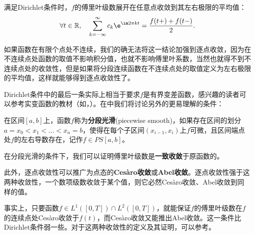 \begin{theorem}[Dirichlet定理]
    满足Dirichlet条件时，$f$的傅里叶级数展开在任意点收敛到其左右极限的平均值：
    \begin{equation}
        \forall t\in \mathbb{R},\quad \sum_{k=-\infty}^{\infty}c_k \e^{\im 2\pi kt}=\frac{f(t+)+f(t-)}{2}.
    \end{equation}
\end{theorem}

如果函数在有限个点处不连续，我们的确无法将这一结论加强到逐点收敛，因为在不连续点处函数的取值不影响积分值，也就不影响傅里叶系数，当然也就得不到不连续点处的收敛性，但是如果将分段连续函数在不连续点处的取值定义为左右极限的平均值，这样就能够得到逐点收敛性了。

Dirichlet条件中的最后一条实际上相当于要求$f$是有界变差函数，感兴趣的读者可以参考实变函数的教材（如\cite{simple_real_analysis}，\cite{real_analysis}）。在中我们将讨论另外的更易理解的条件：
\begin{definition}[分段光滑]
    \label{def:piecewice_smooth}
    在区间$[a,b]$上，函数$f$称为\textbf{分段光滑}(piecewise smooth)，如果存在区间的划分$a=x_0<x_1<\dots <x_n=b$，使得在每个子区间$(x_{i-1},x_i)$上$f$可微，且区间端点处$f$的左右导数存在，记作$f\in PS[a,b]$。
\end{definition}
在分段光滑的条件下，我们可以证明傅里叶级数是\textbf{一致收敛}于原函数的。

此外，逐点收敛性可以推广为点态的\textbf{Cesàro收敛}或\textbf{Abel收敛}。逐点收敛性强于这两种收敛性，一个数项级数收敛于某个值，则它必然Cesàro收敛、Abel收敛到同样的值。

事实上，只要函数$f\in L^1([0,T])\cap L^2([0,T])$，就能保证$f$的傅里叶级数在$f$的连续点处Cesàro收敛于$f(t)$，而Cesàro收敛又能推出Abel收敛。这一条件比Dirichlet条件弱一些。对于这两种收敛性的定义及其证明，可以参考\cite{stein2011fourier}。

